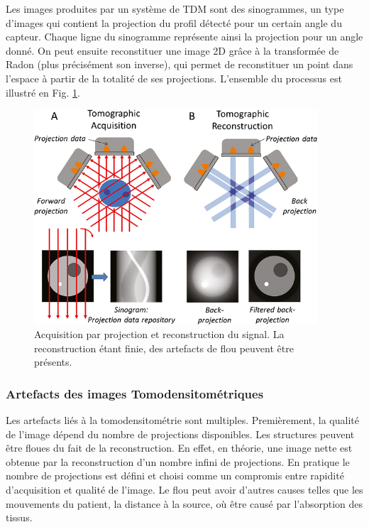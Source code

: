 Les images produites par un système de TDM sont des sinogrammes, un type d'images qui contient la projection du profil détecté pour un certain angle du capteur. Chaque ligne du sinogramme représente ainsi la projection pour un angle donné. On peut ensuite reconstituer une image 2D grâce à la transformée de Radon (plus précisément son inverse), qui permet de reconstituer un point dans l'espace à partir de la totalité de ses projections. L'ensemble du processus est illustré en Fig. \ref{fig:tomography}.

\begin{figure}
    \centering
    \includegraphics[height=8cm]{Images/Tomo_projection.png}
    \caption{Acquisition par projection et reconstruction du signal. La reconstruction étant finie, des artefacts de flou peuvent être présents.}
    \label{fig:tomography}
\end{figure}

\subsubsection{Artefacts des images Tomodensitométriques}

Les artefacts liés à la tomodensitométrie sont multiples. Premièrement, la qualité de l'image dépend du nombre de projections disponibles. Les structures peuvent être floues du fait de la reconstruction. En effet, en théorie, une image nette est obtenue par la reconstruction d'un nombre infini de projections. En pratique le nombre de projections est défini et choisi comme un compromis entre rapidité d'acquisition et qualité de l'image. Le flou peut avoir d'autres causes telles que les mouvements du patient, la distance à la source, où être causé par l'absorption des tissus. 

